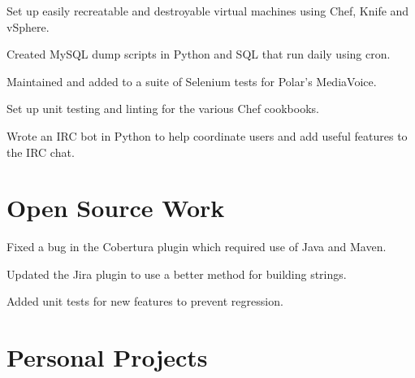 \documentclass[letterpaper]{deedy-resume-modified} %
\begin{document}
\begin{minipage}[t]{0.66\textwidth}
\sectionspace %



\begin{tightitemize}
\item Set up easily recreatable and destroyable virtual machines using Chef, Knife and vSphere.
\item Created MySQL dump scripts in Python and SQL that run daily using cron.
\item Maintained and added to a suite of Selenium tests for Polar's MediaVoice.
\item Set up unit testing and linting for the various Chef cookbooks.
\item Wrote an IRC bot in Python to help coordinate users and add useful features to the IRC chat.
\end{tightitemize}

\sectionspace %


\section{Open Source Work}

\begin{tightitemize}
\item Fixed a bug in the Cobertura plugin which required use of Java and Maven.
\item Updated the Jira plugin to use a better method for building strings.
\item Added unit tests for new features to prevent regression. 
\end{tightitemize}

\sectionspace %


\section{Personal Projects}


\end{minipage}
\end{document}

